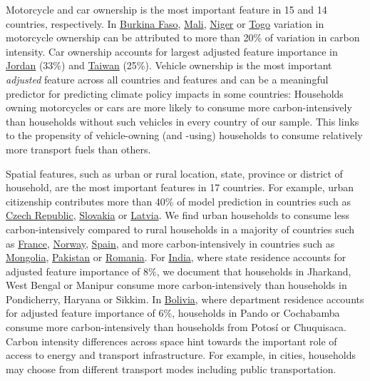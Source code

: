 \documentclass[12pt, a4paper]{article}
\begin{document}
Motorcycle and car ownership is the most important feature in 15 and 14 countries, respectively. In \hyperref[fig:5b_BFA]{Burkina Faso}, \hyperref[fig:5b_MLI]{Mali}, \hyperref[fig:5b_NER]{Niger} or \hyperref[fig:5b_TGO]{Togo} variation in motorcycle ownership can be attributed to more than 20\% of variation in carbon intensity. Car ownership accounts for largest adjusted feature importance in \hyperref[fig:5b_JOR]{Jordan} (33\%) and \hyperref[fig:5b_TWN]{Taiwan} (25\%). Vehicle ownership is the most important \textit{adjusted} feature across all countries and features and can be a meaningful predictor for predicting climate policy impacts in some countries: Households owning motorcycles or cars are more likely to consume more carbon-intensively than households without such vehicles in every country of our sample. This links to the propensity of vehicle-owning (and -using) households to consume relatively more transport fuels than others.

Spatial features, such as urban or rural location, state, province or district of household, are the most important features in 17 countries. For example, urban citizenship contributes more than 40\% of model prediction in countries such as \hyperref[fig:5b_CZE]{Czech Republic}, \hyperref[fig:5b_SVK]{Slovakia} or \hyperref[fig:5b_LVA]{Latvia}. We find urban households to consume less carbon-intensively compared to rural households in a majority of countries such as \hyperref[fig:5b_FRA]{France}, \hyperref[fig:5b_NOR]{Norway}, \hyperref[fig:5b_ESP]{Spain}, and more carbon-intensively in countries such as \hyperref[fig:5b_MNG]{Mongolia}, \hyperref[fig:5b_PAK]{Pakistan} or \hyperref[fig:5b_ROU]{Romania}. For \hyperref[fig:5b_IND]{India}, where state residence accounts for adjusted feature importance of 8\%, we document that households in Jharkand, West Bengal or Manipur consume more carbon-intensively than households in Pondicherry, Haryana or Sikkim. In \hyperref[fig:5b_BOL]{Bolivia}, where department residence accounts for adjusted feature importance of 6\%, households in Pando or Cochabamba consume more carbon-intensively than households from Potosí or Chuquisaca. Carbon intensity differences across space hint towards the important role of access to energy and transport infrastructure. For example, in cities, households may choose from different transport modes including public transportation. 
\end{document}
